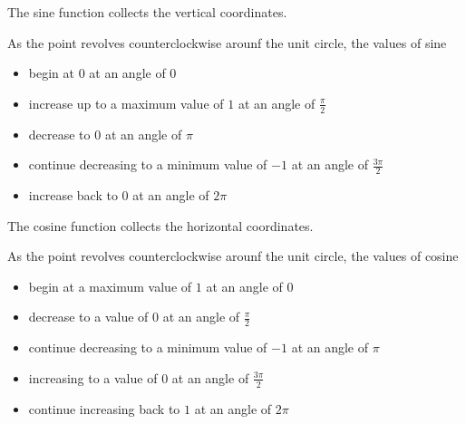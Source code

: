 \documentclass{ximera}
\begin{document}
The sine function collects the vertical coordinates.


\begin{center}
\end{center}

As the point revolves counterclockwise arounf the unit circle, the values of sine 

\begin{itemize}
\item begin at $0$ at an angle of $0$
\item increase up to a maximum value of $1$ at an angle of $\frac{\pi}{2}$
\item decrease to $0$ at an angle of $\pi$
\item continue decreasing to a minimum value of $-1$ at an angle of $\frac{3 \pi}{2}$
\item increase back to $0$ at an angle of $2 \pi$
\end{itemize}










The cosine function collects the horizontal coordinates.

\begin{center}
\end{center}

As the point revolves counterclockwise arounf the unit circle, the values of cosine 

\begin{itemize}
\item begin at a maximum value of $1$ at an angle of $0$
\item decrease to a value of $0$ at an angle of $\frac{\pi}{2}$
\item continue decreasing to a minimum value of $-1$ at an angle of $\pi$
\item increasing to a value of $0$ at an angle of $\frac{3 \pi}{2}$
\item continue increasing back to $1$ at an angle of $2 \pi$
\end{itemize}
\end{document}
